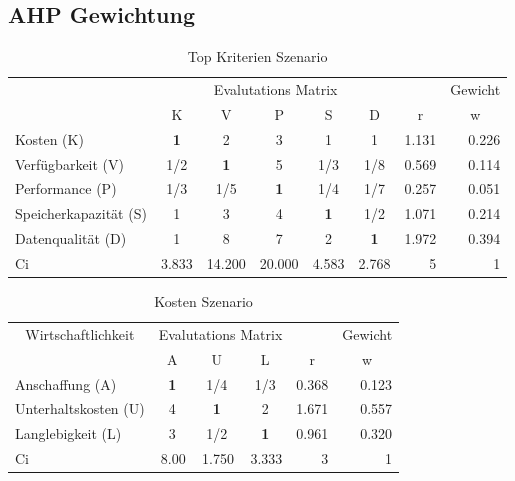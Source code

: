 \subsection{AHP Gewichtung}
\begin{table}[htbp]
\caption{Top Kriterien Szenario}
\begin{tabular}{|l|c|c|c|c|c|r|r|}
\hline
\multicolumn{ 1}{|c|}{} & \multicolumn{ 5}{c|}{Evalutations Matrix} & \multicolumn{1}{l|}{} & \multicolumn{1}{l|}{Gewicht} \\ \cline{ 2- 8}
\multicolumn{ 1}{|c|}{} & K & V & P & S & D & \multicolumn{1}{c|}{r} & \multicolumn{1}{c|}{w} \\ \hline
Kosten (K) & \textbf{1} & 2 & 3 & 1 & 1 & 1.131 & 0.226 \\ \hline
Verfügbarkeit (V) &  1/2 & \textbf{1} & 5 &  1/3 &  1/8 & 0.569 & 0.114 \\ \hline
Performance (P) &  1/3 &  1/5 & \textbf{1} &  1/4 &  1/7 & 0.257 & 0.051 \\ \hline
Speicherkapazität (S) & 1 & 3 & 4 & \textbf{1} &  1/2 & 1.071 & 0.214 \\ \hline
Datenqualität (D) & 1 & 8 & 7 & 2 & \textbf{1} & 1.972 & 0.394 \\ \hline  \hline
Ci & \multicolumn{1}{r|}{3.833} & \multicolumn{1}{r|}{14.200} & \multicolumn{1}{r|}{20.000} & \multicolumn{1}{r|}{4.583} & \multicolumn{1}{r|}{2.768} & 5 & 1 \\ \hline 
\end{tabular}
\label{AHPTopKriterienS}
\end{table}


\begin{table}[htbp]
\caption{Kosten Szenario}
\begin{tabular}{|l|c|c|c|r|r|}
\hline
\multicolumn{ 1}{|c|}{Wirtschaftlichkeit} & \multicolumn{ 3}{c|}{Evalutations Matrix} & \multicolumn{1}{l|}{} & \multicolumn{1}{l|}{Gewicht} \\ \cline{ 2- 6}
\multicolumn{ 1}{|c|}{} & A & U & L & \multicolumn{1}{c|}{r} & \multicolumn{1}{c|}{w} \\ \hline
Anschaffung (A) & \textbf{1} &  1/4 &  1/3 & 0.368 & 0.123 \\ \hline
Unterhaltskosten (U)  & 4 & \textbf{1} & 2 & 1.671 & 0.557 \\ \hline
Langlebigkeit (L) & 3 &  1/2 & \textbf{1} & 0.961 & 0.320 \\ \hline \hline 
Ci & \multicolumn{1}{r|}{8.00} & \multicolumn{1}{r|}{1.750} & \multicolumn{1}{r|}{3.333} & 3 & 1 \\ \hline
\end{tabular}
\label{AHPKostenS}
\end{table}

